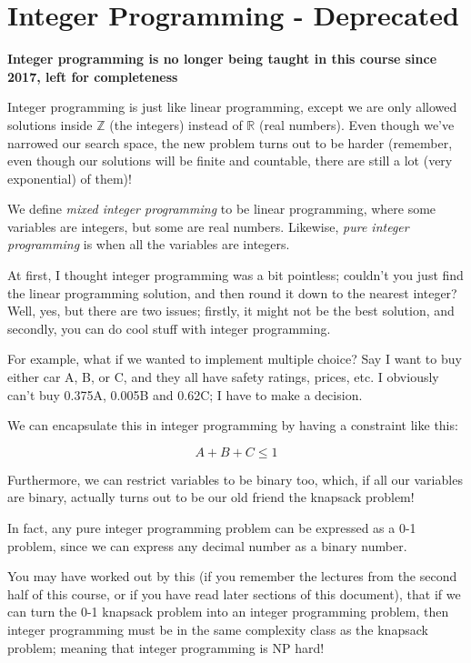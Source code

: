 \section{Integer Programming - Deprecated}
\label{sec:ip}
\textbf{Integer programming is no longer being taught in this course since 2017, left for completeness}

Integer programming is just like linear programming, except we are only allowed
solutions inside $\mathbb{Z}$ (the integers) instead of $\mathbb{R}$ (real
numbers). Even though we've narrowed our search space, the new problem turns out
to be harder (remember, even though our solutions will be finite and countable,
there are still a lot (very exponential) of them)!

We define \textit{mixed integer programming} to be linear programming, where
some variables are integers, but some are real numbers. Likewise, \textit{pure
integer programming} is when all the variables are integers.

At first, I thought integer programming was a bit pointless; couldn't you just
find the linear programming solution, and then round it down to the nearest
integer? Well, yes, but there are two issues; firstly, it might not be the best
solution, and secondly, you can do cool stuff with integer programming.

For example, what if we wanted to implement multiple choice? Say I want to buy
either car A, B, or C, and they all have safety ratings, prices, etc. I
obviously can't buy 0.375A, 0.005B and 0.62C; I have to make a decision.

We can encapsulate this in integer programming by having a constraint like this:

\[
  A + B + C \leq 1
\]

Furthermore, we can restrict variables to be binary too, which, if all our
variables are binary, actually turns out to be our old friend the knapsack
problem!

In fact, any pure integer programming problem can be expressed as a 0-1 problem,
since we can express any decimal number as a binary number.


You may have worked out by this (if you remember the lectures from the second
half of this course, or if you have read later sections of this document), that
if we can turn the 0-1 knapsack problem into an integer programming problem,
then integer programming must be in the same complexity class as the knapsack
problem; meaning that integer programming is NP hard!

